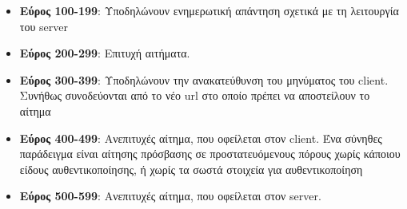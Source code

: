\begin{itemize}
	\item \textbf{Εύρος 100-199}: Υποδηλώνουν ενημερωτική απάντηση σχετικά με τη λειτουργία του server
	\item \textbf{Εύρος 200-299}: Επιτυχή αιτήματα. 
	\item \textbf{Εύρος 300-399}: Υποδηλώνουν την ανακατεύθυνση του μηνύματος του client. Συνήθως συνοδεύονται από το νέο url στο οποίο πρέπει να αποστείλουν το αίτημα
	\item \textbf{Εύρος 400-499}: Ανεπιτυχές αίτημα, που οφείλεται στον client. Ένα σύνηθες παράδειγμα είναι αίτησης πρόσβασης σε προστατευόμενους πόρους χωρίς κάποιου είδους αυθεντικοποίησης, ή χωρίς τα σωστά στοιχεία για αυθεντικοποίηση
	\item \textbf{Εύρος 500-599}: Ανεπιτυχές αίτημα, που οφείλεται στον server. 
\end{itemize}